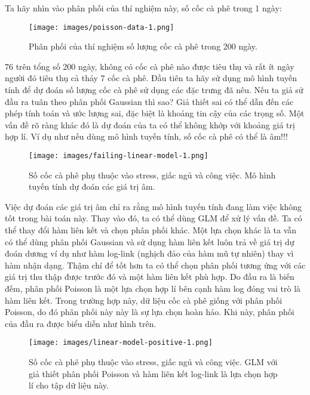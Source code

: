 Ta hãy nhìn vào phân phối của thí nghiệm này, số cốc cà phê trong 1 ngày:

\begin{figure*}[h!]
	\centering
	\texttt{[image: images/poisson-data-1.png]}
	\label{fig:4_3_1}
	\caption{Phân phối của thí nghiệm số lượng cốc cà phê trong 200 ngày.}
\end{figure*}

76 trên tổng số 200 ngày, không có cốc cà phê nào được tiêu thụ và rất ít ngày người đó tiêu thụ cả thảy 7 cốc cà phê. Đầu tiên ta hãy sử dụng mô hình tuyến tính để dự đoán số lượng cốc cà phê sử dụng các đặc trưng đã nêu. Nếu ta giả sử đầu ra tuân theo phân phối Gaussian thì sao? Giả thiết sai có thể dẫn đến các phép tính toán và ước lượng sai, đặc biệt là khoảng tin cậy của các trọng số. Một vấn đề rõ ràng khác đó là dự đoán của ta có thể không khớp với khoảng giá trị hợp lí. Ví dụ như nếu dùng mô hình tuyến tính, số cốc cà phê có thể là âm!!! 

\begin{figure*}[h!]
	\centering
	\texttt{[image: images/failing-linear-model-1.png]}
	\label{fig:4_3_2}
	\caption{Số cốc cà phê phụ thuộc vào stress, giấc ngủ và công việc. Mô hình tuyến tính dự đoán các giá trị âm.}
\end{figure*}

Việc dự đoán các giá trị âm chỉ ra rằng mô hình tuyến tính đang làm việc không tốt trong bài toán này. Thay vào đó, ta có thể dùng GLM để xử lý vấn đề. Ta có thể thay đổi hàm liên kết và chọn phân phối khác. Một lựa chọn khác là ta vẫn có thể dùng phân phối Gaussian và sử dụng hàm liên kết luôn trả về giá trị dự đoán dương ví dụ như hàm log-link (nghịch đảo của hàm mũ tự nhiên) thay vì hàm nhận dạng. Thậm chí để tốt hơn ta có thể chọn phân phối tương ứng với các giá trị thu thập được trước đó và một hàm liên kết phù hợp. Do đầu ra là biến đếm, phân phối Poisson là một lựa chọn hợp lí bên cạnh hàm log đóng vai trò là hàm liên kết. Trong trường hợp này, dữ liệu cốc cà phê giống với phân phối Poisson, do đó phân phối này này là sự lựa chọn hoàn hảo. Khi này, phân phối của đầu ra được biểu diễn như hình trên.

\begin{figure*}[h!]
	\centering
	\texttt{[image: images/linear-model-positive-1.png]}
	\label{fig:4_3_3}
	\caption{Số cốc cà phê phụ thuộc vào stress, giấc ngủ và công việc. GLM với giả thiết phân phối Poisson và hàm liên kết log-link là lựa chọn hợp lí cho tập dữ liệu này.}
\end{figure*}

